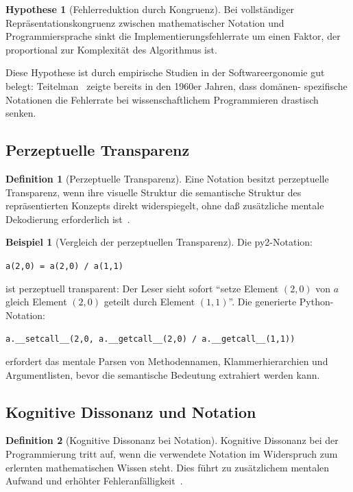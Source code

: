 \documentclass[a4paper,12pt]{article}
\theoremstyle{definition}
\newtheorem{definition}{Definition}
\newtheorem{beispiel}{Beispiel}
\newtheorem{hypothese}{Hypothese}
\begin{document}
\begin{hypothese}[Fehlerreduktion durch Kongruenz]
	Bei vollst\"andiger Repr\"asentationskon\-gruenz zwischen mathematischer Notation
	und Programmiersprache sinkt die Implementierungsfehlerrate um einen Faktor,
	der proportional zur Komplexit\"at des Algorithmus ist.
\end{hypothese}

Diese Hypothese ist durch empirische Studien in der Softwareergonomie gut belegt:
Teitelman~\cite{teitelman1966} zeigte bereits in den 1960er Jahren, dass dom\"anen-
spezifische Notationen die Fehlerrate bei wissenschaftlichem Programmieren drastisch
senken.

\subsection{Perzeptuelle Transparenz}

\begin{definition}[Perzeptuelle Transparenz]
	Eine Notation besitzt perzeptuelle Transparenz, wenn ihre visuelle Struktur die
	semantische Struktur des repr\"asentierten Konzepts direkt widerspiegelt, ohne
	da\ss{} zus\"atzliche mentale Dekodierung erforderlich ist~\cite{blackwell2001}.
\end{definition}

\begin{beispiel}[Vergleich der perzeptuellen Transparenz]
	Die py2-Notation:
	\begin{center}
	\texttt{a(2,0) = a(2,0) / a(1,1)}
	\end{center}
	ist perzeptuell transparent: Der Leser sieht sofort ``setze Element $(2,0)$ von $a$
	gleich Element $(2,0)$ geteilt durch Element $(1,1)$''. Die generierte Python-Notation:
	\begin{center}
	\texttt{a.\_\_setcall\_\_(2,0, a.\_\_getcall\_\_(2,0) / a.\_\_getcall\_\_(1,1))}
	\end{center}
	erfordert das mentale Parsen von Methodennamen, Klammerhierarchien und
	Argumentlisten, bevor die semantische Bedeutung extrahiert werden kann.
\end{beispiel}

\subsection{Kognitive Dissonanz und Notation}

\begin{definition}[Kognitive Dissonanz bei Notation]
	Kognitive Dissonanz bei der Programmierung tritt auf, wenn die verwendete Notation
	im Widerspruch zum erlernten mathematischen Wissen steht. Dies f\"uhrt zu
	zus\"atzlichem mentalen Aufwand und erh\"ohter Fehleranf\"alligkeit~\cite{festinger1957}.
\end{definition}
\end{document}
